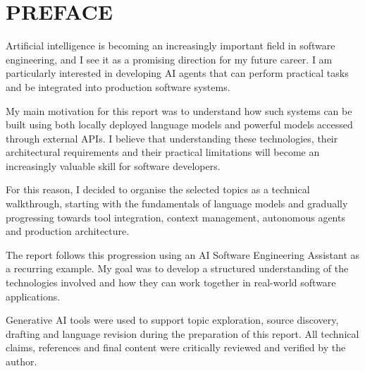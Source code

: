 \chapter*{PREFACE}

Artificial intelligence is becoming an increasingly important field in software engineering, and I see it as a promising direction for my future career. I am particularly interested in developing AI agents that can perform practical tasks and be integrated into production software systems.

My main motivation for this report was to understand how such systems can be built using both locally deployed language models and powerful models accessed through external APIs. I believe that understanding these technologies, their architectural requirements and their practical limitations will become an increasingly valuable skill for software developers.

For this reason, I decided to organise the selected topics as a technical walkthrough, starting with the fundamentals of language models and gradually progressing towards tool integration, context management, autonomous agents and production architecture.

The report follows this progression using an AI Software Engineering Assistant as a recurring example. My goal was to develop a structured understanding of the technologies involved and how they can work together in real-world software applications.

Generative AI tools were used to support topic exploration, source discovery, drafting and language revision during the preparation of this report. All technical claims, references and final content were critically reviewed and verified by the author.
